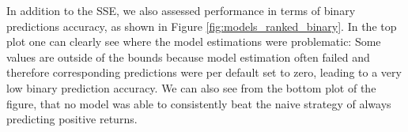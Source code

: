 In addition to the SSE, we also assessed performance in terms of binary predictions accuracy, as shown in Figure \ref{fig:models_ranked_binary}. In the top plot one can clearly see where the model estimations were problematic: Some values are outside of the bounds because model estimation often failed and therefore corresponding predictions were per default set to zero, leading to a very low binary prediction accuracy. We can also see from the bottom plot of the figure, that no model was able to consistently beat the naive strategy of always predicting positive returns. 
